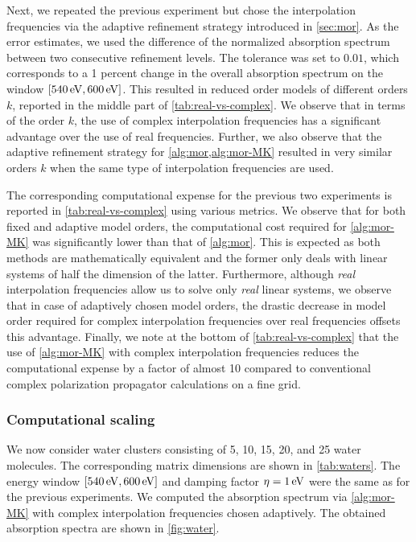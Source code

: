 Next, we repeated the previous experiment but chose the interpolation
frequencies via the adaptive refinement strategy introduced in
\cref{sec:mor}. As the error estimates, we used the difference of
the normalized absorption spectrum between two consecutive refinement
levels. The tolerance was set to $0.01$, which corresponds to a 1
percent change in the overall absorption spectrum on the window
$[540\,\mathrm{eV},600\,\mathrm{eV}]$. This resulted in reduced order models of different
orders $k$, reported in the middle part of
\cref{tab:real-vs-complex}. We observe that in terms of the order
$k$, the use of complex interpolation frequencies has a significant advantage
over the use of real frequencies. Further, we also observe that the adaptive refinement strategy
for \cref{alg:mor,alg:mor-MK} resulted in very similar orders $k$ when the
same type of interpolation frequencies are used.

The corresponding computational expense for the previous two experiments is reported in \cref{tab:real-vs-complex} using various metrics. We observe that for both fixed and adaptive model orders, the computational cost required for \cref{alg:mor-MK} was significantly lower than that of \cref{alg:mor}. This is expected as both methods are mathematically equivalent and the former only deals with linear systems of half the dimension of the latter. Furthermore, although \emph{real} interpolation frequencies allow us to solve only \emph{real} linear systems, we observe that in case of adaptively chosen model orders, the drastic decrease in model order required for complex interpolation frequencies over real frequencies offsets this advantage. Finally, we note at the bottom of \cref{tab:real-vs-complex} that the use of \cref{alg:mor-MK} with complex interpolation frequencies reduces the computational expense by a factor of almost 10 compared to conventional complex polarization propagator calculations on a fine grid.

\subsubsection{Computational scaling}
\label{sec:MORresults-scaling}

We now consider water clusters consisting of 5, 10, 15, 20, and 25 water molecules. The corresponding matrix dimensions are shown in \cref{tab:waters}. The energy window $[540\,\mathrm{eV},600\,\mathrm{eV}]$ and damping factor $\eta = 1\,\mathrm{eV}$ were the same as for the previous experiments. We computed the absorption spectrum via \cref{alg:mor-MK} with complex interpolation frequencies chosen adaptively. The obtained absorption spectra are shown in \cref{fig:water}.

